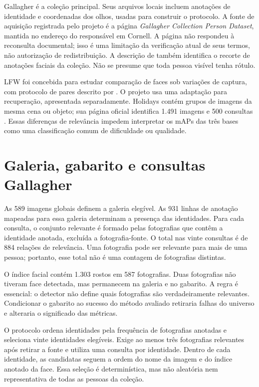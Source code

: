 Gallagher é a coleção principal. Seus arquivos locais incluem anotações de identidade e coordenadas dos olhos, usadas para construir o protocolo. A fonte de aquisição registrada pelo projeto é a página \emph{Gallagher Collection Person Dataset}, mantida no endereço do responsável em Cornell. A página não respondeu à reconsulta documental; isso é uma limitação da verificação atual de seus termos, não autorização de redistribuição. A descrição de  também identifica o recorte de anotações faciais da coleção. Não se presume que toda pessoa visível tenha rótulo.

LFW foi concebida para estudar comparação de faces sob variações de captura, com protocolo de pares descrito por . O projeto usa uma adaptação para recuperação, apresentada separadamente. Holidays contém grupos de imagens da mesma cena ou objeto; sua página oficial identifica 1.491 imagens e 500 consultas \cite{Holidays,Jegou2008}. Essas diferenças de relevância impedem interpretar os mAPs das três bases como uma classificação comum de dificuldade ou qualidade.

\section{Galeria, gabarito e consultas Gallagher}
As 589 imagens globais definem a galeria elegível. As 931 linhas de anotação mapeadas para essa galeria determinam a presença das identidades. Para cada consulta, o conjunto relevante é formado pelas fotografias que contêm a identidade anotada, excluída a fotografia-fonte. O total nas vinte consultas é de 884 relações de relevância. Uma fotografia pode ser relevante para mais de uma pessoa; portanto, esse total não é uma contagem de fotografias distintas.

O índice facial contém 1.303 rostos em 587 fotografias. Duas fotografias não tiveram face detectada, mas permanecem na galeria e no gabarito. A regra é essencial: o detector não define quais fotografias são verdadeiramente relevantes. Condicionar o gabarito ao sucesso do método avaliado retiraria falhas do universo e alteraria o significado das métricas.

O protocolo ordena identidades pela frequência de fotografias anotadas e seleciona vinte identidades elegíveis. Exige ao menos três fotografias relevantes após retirar a fonte e utiliza uma consulta por identidade. Dentro de cada identidade, as candidatas seguem a ordem do nome da imagem e do índice anotado da face. Essa seleção é determinística, mas não aleatória nem representativa de todas as pessoas da coleção.

